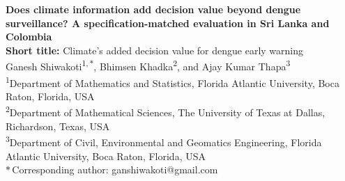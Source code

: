 \documentclass[11pt,a4paper]{article}
\begin{document}
\thispagestyle{fancy}
\begin{center}
{\Large \textbf{Does climate information add decision value beyond dengue surveillance? A specification-matched evaluation in Sri Lanka and Colombia}}\\[1.0em]

{\normalsize \textbf{Short title:} Climate's added decision value for dengue early warning}\\[1.2em]

Ganesh Shiwakoti\textsuperscript{1,\,$\ast$}, Bhimsen Khadka\textsuperscript{2}, and Ajay Kumar Thapa\textsuperscript{3}\\[0.6em]

\footnotesize
\textsuperscript{1}Department of Mathematics and Statistics, Florida Atlantic University, Boca Raton, Florida, USA\\
\textsuperscript{2}Department of Mathematical Sciences, The University of Texas at Dallas, Richardson, Texas, USA\\
\textsuperscript{3}Department of Civil, Environmental and Geomatics Engineering, Florida Atlantic University, Boca Raton, Florida, USA\\[0.3em]
$\ast$\,Corresponding author: ganshiwakoti@gmail.com
\end{center}


\newpage
\end{document}
